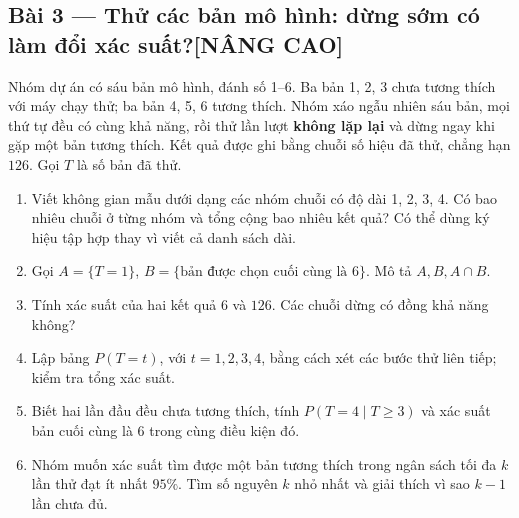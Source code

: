 \documentclass[11pt,a4paper]{article}
\newcommand{\advanced}{\texorpdfstring{\hfill{\normalsize\sffamily\color{Warm}[NÂNG CAO]}}{ [Nâng cao]}}
\begin{document}
\noindent\begin{minipage}{\linewidth}
\subsection*{Bài 3 --- Thử các bản mô hình: dừng sớm có làm đổi xác suất?\advanced}

Nhóm dự án có sáu bản mô hình, đánh số 1--6. Ba bản 1, 2, 3 chưa tương thích với máy chạy thử; ba bản 4, 5, 6 tương thích. Nhóm xáo ngẫu nhiên sáu bản, mọi thứ tự đều có cùng khả năng, rồi thử lần lượt \textbf{không lặp lại} và dừng ngay khi gặp một bản tương thích. Kết quả được ghi bằng chuỗi số hiệu đã thử, chẳng hạn \(126\). Gọi \(T\) là số bản đã thử.

\begin{enumerate}[label=\alph*)]
\item Viết không gian mẫu dưới dạng các nhóm chuỗi có độ dài 1, 2, 3, 4. Có bao nhiêu chuỗi ở từng nhóm và tổng cộng bao nhiêu kết quả? Có thể dùng ký hiệu tập hợp thay vì viết cả danh sách dài.
\item Gọi \(A=\{T=1\}\), \(B=\{\text{bản được chọn cuối cùng là 6}\}\). Mô tả \(A,B,A\cap B\).
\item Tính xác suất của hai kết quả \(6\) và \(126\). Các chuỗi dừng có đồng khả năng không?
\item Lập bảng \(P(T=t)\), với \(t=1,2,3,4\), bằng cách xét các bước thử liên tiếp; kiểm tra tổng xác suất.
\item Biết hai lần đầu đều chưa tương thích, tính \(P(T=4\mid T\ge3)\) và xác suất bản cuối cùng là 6 trong cùng điều kiện đó.
\item Nhóm muốn xác suất tìm được một bản tương thích trong ngân sách tối đa \(k\) lần thử đạt ít nhất \(95\%\). Tìm số nguyên \(k\) nhỏ nhất và giải thích vì sao \(k-1\) lần chưa đủ.
\end{enumerate}

\end{minipage}\par

\par\medskip
\end{document}
